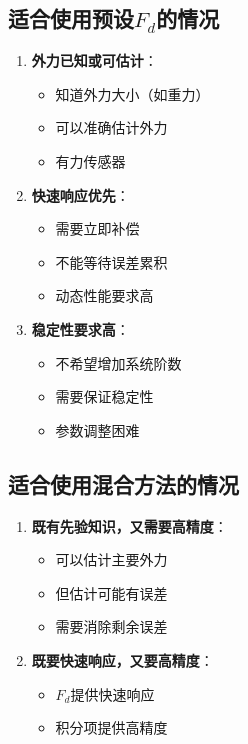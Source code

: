 \documentclass[12pt,a4paper]{article}
\begin{document}
\subsection{适合使用预设$F_d$的情况}

\begin{enumerate}
\item \textbf{外力已知或可估计}：
\begin{itemize}
\item 知道外力大小（如重力）
\item 可以准确估计外力
\item 有力传感器
\end{itemize}

\item \textbf{快速响应优先}：
\begin{itemize}
\item 需要立即补偿
\item 不能等待误差累积
\item 动态性能要求高
\end{itemize}

\item \textbf{稳定性要求高}：
\begin{itemize}
\item 不希望增加系统阶数
\item 需要保证稳定性
\item 参数调整困难
\end{itemize}
\end{enumerate}

\subsection{适合使用混合方法的情况}

\begin{enumerate}
\item \textbf{既有先验知识，又需要高精度}：
\begin{itemize}
\item 可以估计主要外力
\item 但估计可能有误差
\item 需要消除剩余误差
\end{itemize}

\item \textbf{既要快速响应，又要高精度}：
\begin{itemize}
\item $F_d$提供快速响应
\item 积分项提供高精度
\end{itemize}
\end{enumerate}
\end{document}
